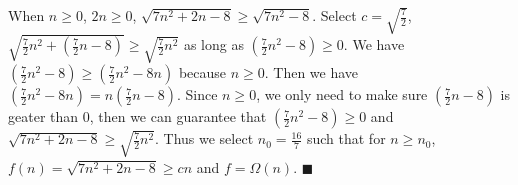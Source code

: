 \documentclass[11pt]{article}
\begin{document}
\begin{enumerate}[label=(\alph*)]
				When $n \geq 0 $, $2n \geq 0$, $\sqrt{7n^2 +2n-8} \geq \sqrt{7n^2-8}  $. 
				Select $c = \sqrt{\frac{7}{2}}$, $\sqrt{\frac{7}{2}n^2 + (\frac{7}{2}n-8)} \geq \sqrt{\frac{7}{2}n^2}$ as long as $(\frac{7}{2}n^2-8) \geq 0$.
				We have $(\frac{7}{2}n^2-8) \geq (\frac{7}{2}n^2-8n)$ because $n \geq 0$. Then we have $(\frac{7}{2}n^2-8n) = n(\frac{7}{2}n-8)$.
				Since $n \geq 0$, we only need to make sure $(\frac{7}{2}n-8)$ is geater than 0, then
				we can guarantee that  $(\frac{7}{2}n^2-8) \geq 0$ and $\sqrt{7n^2 +2n-8} \geq \sqrt{\frac{7}{2}n^2}$.
				Thus we select $n_0 = \frac{16}{7}$ such that for $n \geq n_0$, $f(n) = \sqrt{7n^2 +2n-8}  \geq cn$ and $ f = \Omega(n)$. $\blacksquare$\\
				
			 
								
	\end{enumerate}
		
\end{document}
